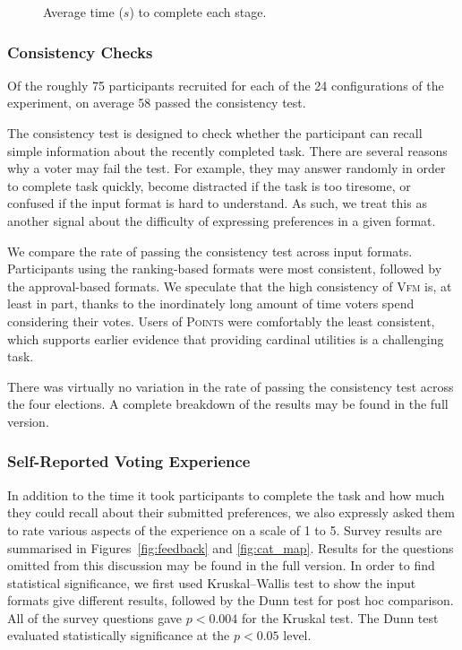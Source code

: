 \documentclass[twoside,11pt]{article}
\newcommand{\kibitz}[2]{\ifnum\Comments=1{\color{#1}{#2}}\fi}
\newcommand{\gb}[1]{\kibitz{red}{[GB:#1]}}
\newcommand{\points}{\textsc{Points}}
\newcommand{\vfm}{\textsc{Vfm}}
\begin{document}
\begin{figure}[!h]
\begin{center}
\caption{Average time ($s$) to complete each stage. \gb{fix ratios, increase fonts}
}\label{fig:time}
\end{center}
\end{figure}

\subsubsection{Consistency Checks}
 
Of the roughly 75 participants  recruited for each of the 24 configurations of the experiment, on average 58 passed the consistency test. 

The consistency test  is designed to check whether the participant can recall simple information about the recently completed task. 
%
There are several reasons why a voter may fail the test. For example, they may answer randomly in order to complete task quickly,  become  distracted  if the task is too tiresome, or confused if the input format is hard to understand. As such, we  treat this as another signal about the difficulty of expressing  preferences in a given format. 

 

We  compare the rate of passing the consistency test across input formats. 
Participants using the ranking-based formats were most consistent, followed by the approval-based formats.  We speculate that the high consistency of \vfm{} is, at least in part, thanks to the inordinately long amount of time voters spend considering their votes. Users of \points{} were comfortably the least consistent, which  supports earlier evidence that providing cardinal utilities is a challenging task.

There was virtually no variation in the rate of passing the consistency test across the four elections. A complete breakdown of the results may be found in the full version. 

 

\subsubsection{Self-Reported Voting Experience}
In addition to the time it took participants to complete the task and how much they could recall about their submitted preferences, we also expressly asked them to rate various aspects of the experience on a scale of 1 to 5. 
Survey results are summarised in  Figures~\ref{fig:feedback} and \ref{fig:cat_map}. 
Results for the questions omitted from this discussion may be found in the full version.
In order to find statistical significance, we first used Kruskal–Wallis test to show the input formats give different results, followed by the Dunn test for post hoc comparison.
All of the survey questions   gave $p < 0.004$  for the Kruskal test. The Dunn test evaluated statistically significance   at the $p < 0.05$ level.
\end{document}
